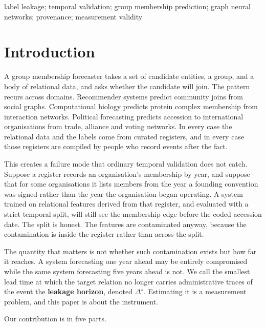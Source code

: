 \documentclass[twoside,11pt]{article}
\begin{document}
\begin{keywords}
label leakage; temporal validation; group membership prediction; graph neural networks; provenance; measurement validity
\end{keywords}

\section{Introduction}

A group membership forecaster takes a set of candidate entities, a group, and a body of relational data, and asks whether the candidate will join. The pattern recurs across domains. Recommender systems predict community joins from social graphs. Computational biology predicts protein complex membership from interaction networks. Political forecasting predicts accession to international organisations from trade, alliance and voting networks. In every case the relational data and the labels come from curated registers, and in every case those registers are compiled by people who record events after the fact.

This creates a failure mode that ordinary temporal validation does not catch. Suppose a register records an organisation's membership by year, and suppose that for some organisations it lists members from the year a founding convention was signed rather than the year the organisation began operating. A system trained on relational features derived from that register, and evaluated with a strict temporal split, will still see the membership edge before the coded accession date. The split is honest. The features are contaminated anyway, because the contamination is inside the register rather than across the split.

The quantity that matters is not whether such contamination exists but how far it reaches. A system forecasting one year ahead may be entirely compromised while the same system forecasting five years ahead is not. We call the smallest lead time at which the target relation no longer carries administrative traces of the event the \textbf{leakage horizon}, denoted \(\Delta^{\star}\). Estimating it is a measurement problem, and this paper is about the instrument.

Our contribution is in five parts.
\end{document}

